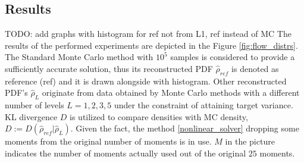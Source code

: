 \documentclass{article}
\def\todo#1{{\color{red}TODO: #1}}
\begin{document}
\subsection{Results}
\todo{add graphs with histogram for ref not from L1, ref instead of MC}
The results of the performed experiments are depicted in the Figure \ref{fig:flow_distrs}. The Standard Monte Carlo method with $10^5$ samples is considered to provide a sufficiently accurate solution, thus its reconstructed PDF $\hat{\rho}_{ref}$ is denoted as reference (ref) and it is drawn alongside with histogram. Other reconstructed PDF's $\hat{\rho}_{L}$  originate from data obtained by Monte Carlo methods with a different number of levels $L = 1, 2, 3, 5$ under the constraint of attaining target variance. 
KL divergence $D$ is utilized to compare densities with MC density, $D := D(\hat{\rho}_{ref}|\hat{\rho}_{L})$.
Given the fact, the method \ref{nonlinear_solver} dropping some moments from the original number of moments is in use. $M$ in the picture indicates the number of moments actually used out of the original $25$ moments.
\end{document}
